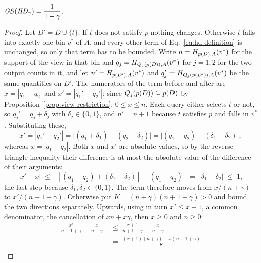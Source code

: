 \begin{proposition}
\label{prop:hd-sensitivity}
$\mathit{GS}(\mathit{HD}_\gamma)=\dfrac{1}{1+\gamma}$.
\end{proposition}

\begin{proof}
Let $D'=D\cup\{t\}$.
If $t$ does not satisfy $p$ nothing changes.
Otherwise $t$ falls into exactly one bin $v^*$ of $A$, and every other term of Eq.~\eqref{eq:hd-definition} is unchanged, so only that term has to be bounded.
Write $n=H_{p(D),A}(v^*)$ for the support of the view in that bin and $q_j=H_{Q_j(p(D)),A}(v^*)$ for $j=1,2$ for the two output counts in it, and let $n'=H_{p(D'),A}(v^*)$ and $q_j'=H_{Q_j(p(D')),A}(v^*)$ be the same quantities on $D'$.
The numerators of the term before and after are $x=|q_1-q_2|$ and $x'=|q_1'-q_2'|$; since $Q_j(p(D))\subseteq p(D)$ by Proposition~\ref{prop:view-restriction}, $0\le x\le n$.
Each query either selects $t$ or not, so $q_j'=q_j+\delta_j$ with $\delta_j\in\{0,1\}$, and $n'=n+1$ because $t$ satisfies $p$ and falls in $v^*$.
Substituting these,
\[
x'=|q_1'-q_2'|=\big|(q_1+\delta_1)-(q_2+\delta_2)\big|=\big|(q_1-q_2)+(\delta_1-\delta_2)\big| ,
\]
whereas $x=|q_1-q_2|$.
Both $x$ and $x'$ are absolute values, so by the reverse triangle inequality their difference is at most the absolute value of the difference of their arguments:
\[
|x'-x|\;\le\;\big|\,[(q_1-q_2)+(\delta_1-\delta_2)]-(q_1-q_2)\,\big|\;=\;|\delta_1-\delta_2|\;\le\;1 ,
\]
the last step because $\delta_1,\delta_2\in\{0,1\}$.
The term therefore moves from $x/(n+\gamma)$ to $x'/(n+1+\gamma)$.
Otherwise put $K=(n+\gamma)(n+1+\gamma)>0$ and bound the two directions separately.
Upwards, using in turn $x'\le x+1$, a common denominator, the cancellation of $xn+x\gamma$, then $x\ge0$ and $n\ge0$:
\begin{align*}
\frac{x'}{n+1+\gamma}-\frac{x}{n+\gamma}
&\;\le\;\frac{x+1}{n+1+\gamma}-\frac{x}{n+\gamma}\\[2pt]
&\;=\;\frac{(x+1)(n+\gamma)-x(n+1+\gamma)}{K}\\[2pt]

\end{align*}
\end{proof}
